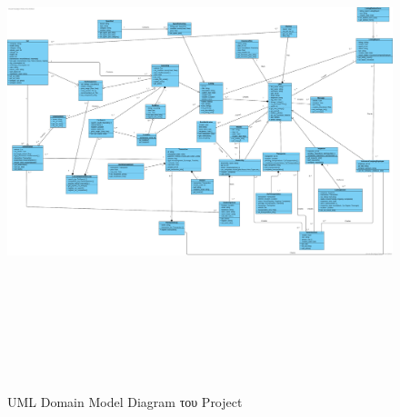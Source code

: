\documentclass{../ol-softwaremanual}
\begin{document}
	\begin{figure}[htbp!]		
		\includegraphics[width=\textwidth+3.45cm, height=15cm]{img/Domain_model.png}
		\caption{\en UML Domain Model Diagram \gr του \en Project \gr}
	\end{figure}
	
	
	
	\newpage
	
	
\end{document}
